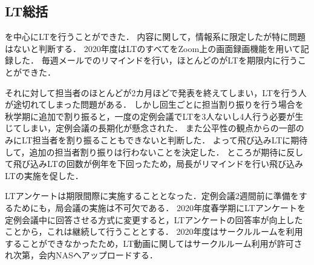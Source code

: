 \subsection*{LT総括}


\firstGrade{}を中心にLTを行うことができた．
内容に関して，情報系に限定したが特に問題はないと判断する．
2020年度はLTのすべてをZoom上の画面録画機能を用いて記録した．
毎週メールでのリマインドを行い，ほとんどの\firstGrade{}がLTを期限内に行うことができた．

それに対して\firstGrade{}担当者のほとんどが2カ月ほどで発表を終えてしまい，LTを行う人が途切れてしまった問題がある．
しかし回生ごとに担当割り振りを行う場合\thirdGrade{}を秋学期に追加で割り振ると，一度の定例会議でLTを3人ないし4人行う必要が生じてしまい，定例会議の長期化が懸念された．
また公平性の観点から\thirdGrade{}の一部のみにLT担当者を割り振ることもできないと判断した．
よって飛び込みLTに期待して，追加の担当者割り振りは行わないことを決定した．
ところが期待に反して飛び込みLTの回数が例年を下回ったため，局長がリマインドを行い飛び込みLTの実施を促した．

LTアンケートは期限間際に実施することとなった．定例会議2週間前に準備をするためにも，局会議の実施は不可欠である．
2020年度春学期にLTアンケートを定例会議中に回答させる方式に変更すると，LTアンケートの回答率が向上したことから，これは継続して行うこととする．
2020年度はサークルルームを利用することができなかったため，LT動画に関してはサークルルーム利用が許可され次第，会内NASへアップロードする．
